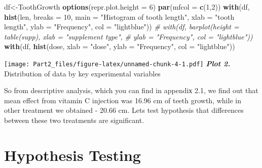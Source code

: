 \documentclass[
]{article}
\newenvironment{Shaded}{\begin{snugshade}}{\end{snugshade}}
\newcommand{\AttributeTok}[1]{\textcolor[rgb]{0.13,0.29,0.53}{#1}}
\newcommand{\CommentTok}[1]{\textcolor[rgb]{0.56,0.35,0.01}{\textit{#1}}}
\newcommand{\DecValTok}[1]{\textcolor[rgb]{0.00,0.00,0.81}{#1}}
\newcommand{\FunctionTok}[1]{\textcolor[rgb]{0.13,0.29,0.53}{\textbf{#1}}}
\newcommand{\NormalTok}[1]{#1}
\newcommand{\OtherTok}[1]{\textcolor[rgb]{0.56,0.35,0.01}{#1}}
\newcommand{\SpecialCharTok}[1]{\textcolor[rgb]{0.81,0.36,0.00}{\textbf{#1}}}
\newcommand{\StringTok}[1]{\textcolor[rgb]{0.31,0.60,0.02}{#1}}
\begin{document}
\begin{Shaded}
\begin{Highlighting}[]
\NormalTok{df}\OtherTok{\textless{}{-}}\NormalTok{ToothGrowth}
\FunctionTok{options}\NormalTok{(}\AttributeTok{repr.plot.height =} \DecValTok{6}\NormalTok{)}
\FunctionTok{par}\NormalTok{(}\AttributeTok{mfcol =} \FunctionTok{c}\NormalTok{(}\DecValTok{1}\NormalTok{,}\DecValTok{2}\NormalTok{))}
\FunctionTok{with}\NormalTok{(df, }\FunctionTok{hist}\NormalTok{(len, }\AttributeTok{breaks =} \DecValTok{10}\NormalTok{, }\AttributeTok{main =} \StringTok{"Histogram of tooth length"}\NormalTok{, }
              \AttributeTok{xlab =} \StringTok{"tooth length"}\NormalTok{, }\AttributeTok{ylab =} \StringTok{"Frequency"}\NormalTok{, }\AttributeTok{col =} \StringTok{"lightblue"}\NormalTok{))}
\CommentTok{\# with(df, barplot(height = table(supp), xlab = "supplement type",}
\CommentTok{\#                  ylab = "Frequency", col = "lightblue"))}
\FunctionTok{with}\NormalTok{(df, }\FunctionTok{hist}\NormalTok{(dose, }\AttributeTok{xlab =} \StringTok{"dose"}\NormalTok{, }\AttributeTok{ylab =} \StringTok{"Frequency"}\NormalTok{, }\AttributeTok{col =} \StringTok{"lightblue"}\NormalTok{))}
\end{Highlighting}
\end{Shaded}

\texttt{[image: Part2\_files/figure-latex/unnamed-chunk-4-1.pdf]}
\textbf{\emph{Plot 2.}} Distribution of data by key experimental
variables

So from descriptive analysis, which you can find in appendiх 2.1, we
find out that mean effect from vitamin C injection was 16.96 cm of teeth
growth, while in other treatment we obtained - 20.66 cm. Lets test
hypothesis that differences between these two treatments are
significant.

\section{Hypothesis Testing}\label{hypothesis-testing}

\begin{Shaded}
\end{Shaded}
\end{document}
